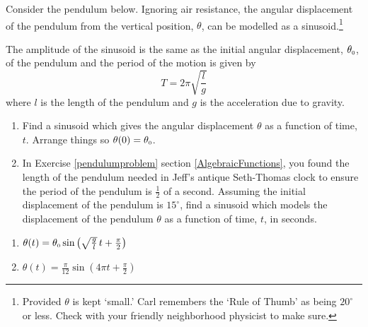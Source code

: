 { Consider the pendulum below.  Ignoring air resistance, the angular displacement of the pendulum from the vertical position, $\theta$, can be modelled as a sinusoid.\footnote{Provided $\theta$ is kept `small.'  Carl remembers the `Rule of Thumb' as being $20^{\circ}$ or less.  Check with your friendly neighborhood physicist to make sure.}

\begin{center}
\end{center} 

The amplitude of the sinusoid is the same as the initial angular displacement, $\theta_{\text{\tiny $0$}}$, of the pendulum and the  period of the motion is given by \[T = 2\pi \sqrt{\dfrac{l}{g}}\] where $l$ is the length of the pendulum and $g$ is the acceleration due to gravity. 

\begin{enumerate}
\item   Find a sinusoid which gives the angular displacement $\theta$ as a function of time, $t$. Arrange things so $\theta(0) = \theta_{\text{\tiny $0$}}$. 
\item  In Exercise \ref{pendulumproblem} section \ref{AlgebraicFunctions}, you found the length of the pendulum needed in Jeff's antique Seth-Thomas clock to ensure the period of the pendulum is $\frac{1}{2}$ of a second. Assuming the initial displacement of the pendulum is $15^{\circ}$, find a sinusoid which models the displacement of the pendulum $\theta$ as a function of time, $t$, in seconds. 
\end{enumerate}}
{\begin{enumerate}
 \item  $\theta(t) = \theta_{\text{\tiny $0$}} \sin\left(\sqrt{\frac{g}{l}}\, t + \frac{\pi}{2}\right)$ 
 \item  $\theta(t) = \frac{\pi}{12} \sin\left(4\pi t + \frac{\pi}{2}\right)$ 
 \end{enumerate}}
